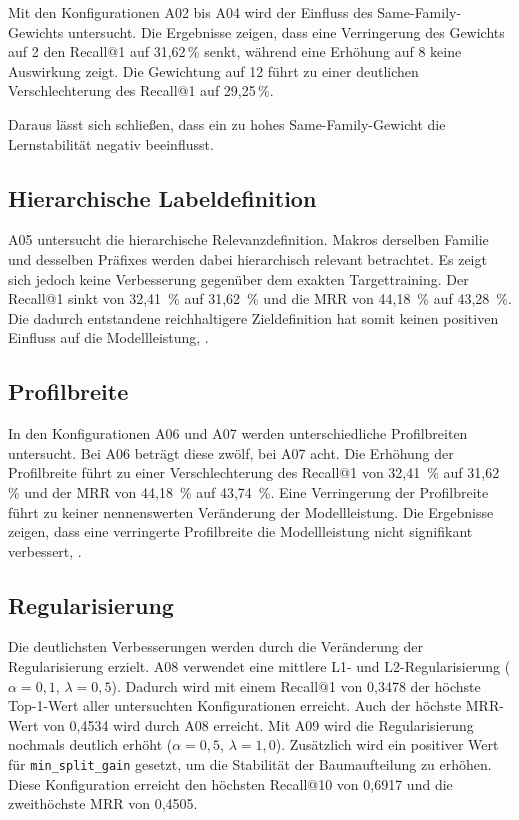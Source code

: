 Mit den Konfigurationen A02 bis A04 wird der Einfluss des Same-Family-Gewichts untersucht. 
Die Ergebnisse zeigen, dass eine Verringerung des Gewichts auf 2 den Recall@1 auf 31,62\,\% senkt, während eine Erhöhung auf 8 keine Auswirkung zeigt.
Die Gewichtung auf 12 führt zu einer deutlichen Verschlechterung des Recall@1 auf 29,25\,\%.

Daraus lässt sich schließen, dass ein zu hohes Same-Family-Gewicht die Lernstabilität negativ beeinflusst.

\subsection{Hierarchische Labeldefinition}

A05 untersucht die hierarchische Relevanzdefinition. Makros \parencite{EPLAN-Makros} derselben Familie und desselben Präfixes werden dabei hierarchisch relevant betrachtet.
Es zeigt sich jedoch keine Verbesserung gegenüber dem exakten Targettraining. Der Recall@1 sinkt von 32,41 \,\% auf 31,62 \,\% und die MRR von 44,18 \,\% auf 43,28 \,\%.
Die dadurch entstandene reichhaltigere Zieldefinition hat somit keinen positiven Einfluss auf die Modellleistung, \parencite{LTR_Configuration_Test_Series}.

\subsection{Profilbreite}

In den Konfigurationen A06 und A07 werden unterschiedliche Profilbreiten untersucht. Bei A06 beträgt diese zwölf, bei A07 acht.
Die Erhöhung der Profilbreite führt zu einer Verschlechterung des Recall@1 von 32,41 \,\% auf 31,62 \,\% und der MRR von 44,18 \,\% auf 43,74 \,\%.
Eine Verringerung der Profilbreite führt zu keiner nennenswerten Veränderung der Modellleistung. 
Die Ergebnisse zeigen, dass eine verringerte Profilbreite die Modellleistung nicht signifikant verbessert, \parencite{LTR_Configuration_Test_Series}.

\subsection{Regularisierung}

Die deutlichsten Verbesserungen werden durch die Veränderung der Regularisierung erzielt.
A08 verwendet eine mittlere L1- und L2-Regularisierung (\(\alpha = 0{,}1\), \(\lambda = 0{,}5\)). 
Dadurch wird mit einem Recall@1 von 0,3478 der höchste Top-1-Wert aller untersuchten Konfigurationen erreicht. Auch der höchste MRR-Wert von 0,4534 wird durch A08 erreicht.
Mit A09 wird die Regularisierung nochmals deutlich erhöht (\(\alpha = 0{,}5\), \(\lambda = 1{,}0\)). Zusätzlich wird ein positiver Wert für \texttt{min\_split\_gain} gesetzt, um die Stabilität der Baumaufteilung zu erhöhen. 
Diese Konfiguration erreicht den höchsten Recall@10 von 0,6917 und die zweithöchste MRR von 0,4505.

